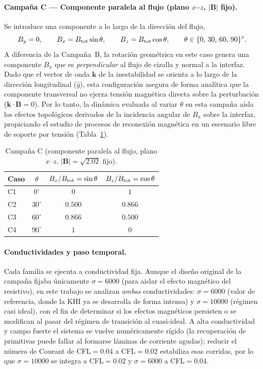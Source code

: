 \paragraph{Campaña C — Componente paralela al flujo (plano $x$--$z$, $|\mathbf B|$ fijo).} Se introduce una componente a lo largo de la dirección del flujo,
\begin{equation}
B_y=0,\qquad B_x=B_{\rm tot}\sin\theta,\qquad B_z=B_{\rm tot}\cos\theta,\qquad \theta\in\{0,\,30,\,60,\,90\}^\circ.
\end{equation}
A diferencia de la Campaña~B, la rotación geométrica en este caso genera una componente $B_x$ que es \emph{perpendicular} al flujo de cizalla y normal a la interfaz. Dado que el vector de onda $\mathbf{k}$ de la inestabilidad se orienta a lo largo de la dirección longitudinal ($\hat{y}$), esta configuración asegura de forma analítica que la componente transversal no ejerza tensión magnética directa sobre la perturbación ($\mathbf{k}\cdot\mathbf{B} = 0$). Por lo tanto, la dinámica evaluada al variar $\theta$ en esta campaña aísla los efectos topológicos derivados de la incidencia angular de $B_x$ sobre la interfaz, propiciando el estudio de procesos de reconexión magnética en un escenario libre de soporte por tensión (Tabla~\ref{tab:campana_C}).

\begin{table}[H]\centering
\caption{Campaña C (componente paralela al flujo, plano $x$--$z$, $|\mathbf B|=\sqrt{2.02}$ fijo).}
\label{tab:campana_C}
\begin{tabular}{lccc}
\hline
Caso & $\theta$ & $B_x/B_{\rm tot}=\sin\theta$ & $B_z/B_{\rm tot}=\cos\theta$ \\
\hline
C1 & $0^\circ$  & $0$     & $1$     \\
C2 & $30^\circ$ & $0.500$ & $0.866$ \\
C3 & $60^\circ$ & $0.866$ & $0.500$ \\
C4 & $90^\circ$ & $1$     & $0$     \\
\hline
\end{tabular}
\end{table}

\paragraph{Conductividades y paso temporal.} Cada familia se ejecuta a conductividad fija. Aunque el diseño original de la campaña fijaba únicamente $\sigma=6000$ (para aislar el efecto magnético del resistivo), en este trabajo se analizan \emph{ambas} conductividades: $\sigma=6000$ (valor de referencia, donde la KHI ya se desarrolla de forma intensa) y $\sigma=10000$ (régimen casi ideal), con el fin de determinar si los efectos magnéticos persisten o se modifican al pasar del régimen de transición al cuasi-ideal. A alta conductividad y campo fuerte el sistema se vuelve numéricamente rígido (la recuperación de primitivas puede fallar al formarse láminas de corriente agudas); reducir el número de Courant de CFL$=0.04$ a CFL$=0.02$ estabiliza esas corridas, por lo que $\sigma=10000$ se integra a CFL$=0.02$ y $\sigma=6000$ a CFL$=0.04$.

